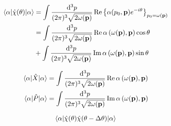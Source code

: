 \begin{lemma}
	\begin{equation}
		\begin{split}
			\expval{\hat\chi(\theta)}{\alpha}
			&=
			\int\frac{\dd[3]{p}}{(2\pi)^3\sqrt{2\omega(\vb{p})}}
			\operatorname{\operatorname{Re}}\left\{
				\alpha(p_0,\vb{p})
				e^{-i\theta}
			\right\}_{p_0=\omega(\vb{p})}
			\\
			&=
			\int\frac{\dd[3]{p}}{(2\pi)^3\sqrt{2\omega(\vb{p})}}
			\operatorname{\operatorname{Re}}\alpha\left(\omega(\vb{p}),\vb{p}\right)
			\cos\theta
			\\
			&+
			\int\frac{\dd[3]{p}}{(2\pi)^3\sqrt{2\omega(\vb{p})}}
			\operatorname{\operatorname{Im}}\alpha\left(\omega(\vb{p}),\vb{p}\right)
			\sin\theta
		\end{split}
	\end{equation}
\end{lemma}
\begin{corollary}
	\begin{align}
		\expval{\hat{X}}{\alpha}
		&=
		\int\frac{\dd[3]{p}}{(2\pi)^3\sqrt{2\omega(\vb{p})}}
		\operatorname{\operatorname{Re}}\alpha\left(\omega(\vb{p}),\vb{p}\right)
		\\
		\expval{\hat{P}}{\alpha}
		&=
		\int\frac{\dd[3]{p}}{(2\pi)^3\sqrt{2\omega(\vb{p})}}
		\operatorname{\operatorname{Im}}\alpha\left(\omega(\vb{p}),\vb{p}\right)
	\end{align}
\end{corollary}
\begin{lemma}
	\begin{equation}
		\expval{\hat\chi(\theta)\hat\chi(\theta-\Delta\theta)}{\alpha}
	\end{equation}
\end{lemma}
